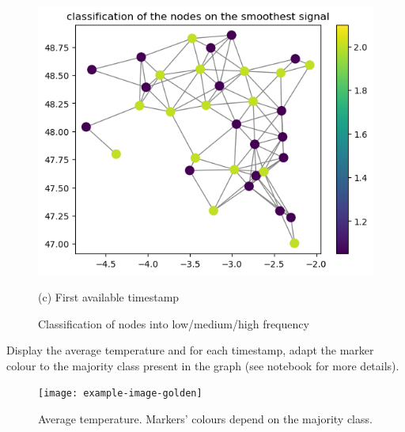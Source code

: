 \documentclass[11pt]{article}
\begin{document}
\begin{solution}
\begin{figure}
    \begin{minipage}[t]{0.45\textwidth}    \centerline{\includegraphics[width=\textwidth]{q5_c.png}}
    \centerline{(c) First available timestamp}
    \end{minipage}
    \caption{Classification of nodes into low/medium/high frequency}\label{fig:node-classif}
\end{figure}
\end{solution}

\newpage
\begin{exercise}
Display the average temperature and for each timestamp, adapt the marker colour to the majority class present in the graph (see notebook for more details).
\end{exercise}

\begin{solution}
\begin{figure}
    \centering
    \begin{minipage}[t]{0.8\textwidth}
    \centerline{\texttt{[image: example-image-golden]}}
    \end{minipage}
    \caption{Average temperature. Markers' colours depend on the majority class.}
\end{figure}
\end{solution}
\end{document}
